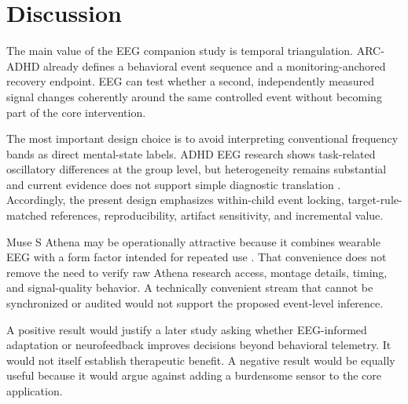 \section{Discussion}

The main value of the EEG companion study is temporal triangulation. ARC-ADHD already defines a behavioral event sequence and a monitoring-anchored recovery endpoint. EEG can test whether a second, independently measured signal changes coherently around the same controlled event without becoming part of the core intervention.

The most important design choice is to avoid interpreting conventional frequency bands as direct mental-state labels. ADHD EEG research shows task-related oscillatory differences at the group level, but heterogeneity remains substantial and current evidence does not support simple diagnostic translation \parencite{michelini2022eventoscillations,slater2022eegsubtypes}. Accordingly, the present design emphasizes within-child event locking, target-rule-matched references, reproducibility, artifact sensitivity, and incremental value.

Muse S Athena may be operationally attractive because it combines wearable EEG with a form factor intended for repeated use \parencite{interaxonAthena2026}. That convenience does not remove the need to verify raw Athena research access, montage details, timing, and signal-quality behavior. A technically convenient stream that cannot be synchronized or audited would not support the proposed event-level inference.

A positive result would justify a later study asking whether EEG-informed adaptation or neurofeedback improves decisions beyond behavioral telemetry. It would not itself establish therapeutic benefit. A negative result would be equally useful because it would argue against adding a burdensome sensor to the core application.
